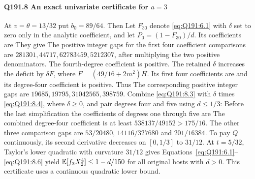 \paragraph{Q191.8 An exact univariate certificate for $a=\allowbreak 3$}\label{part:Q191.8}
At $v=\allowbreak \theta=\allowbreak 13/32$ put $b_0=\allowbreak 89/64$. Then
Let $F_{30}$ denote \eqref{eq:Q191:6.1} with $\delta$ set to zero only
in the analytic coefficient, and let $P_0=\allowbreak (1-F_{30})/d$. Its coefficients are
They give
The positive integer gaps for the first four coefficient comparisons are
$281301,\allowbreak 44717,\allowbreak 62783459,\allowbreak 5212307$, after multiplying the two positive
denominators. The fourth-degree coefficient is positive.
The retained $\delta$ increases the deficit by $\delta F$, where
$F=\allowbreak (49/16+2m^2)H$. Its first four coefficients are
and its degree-four coefficient is positive. Thus
The corresponding positive integer gaps are $19685,\allowbreak 19795,\allowbreak 31042565,\allowbreak 398759$.
Combine \eqref{eq:Q191:8.3} with $\delta$ times \eqref{eq:Q191:8.4},
where $\delta\ge0$, and pair degrees four and five using $d\le\allowbreak1/3$:
Before the last simplification the coefficients of degrees one through five are
The combined degree-four coefficient is at least $538137/49152>\allowbreak 175/16$.
The other three comparison gaps are $53/20480$, $14116/327680$ and
$201/16384$. To pay $Q$ continuously, its second derivative decreases on
$[0,\allowbreak 1/3]$ to $31/12$. At $t=\allowbreak 5/32$,
Taylor's lower quadratic with curvature $31/12$ gives
Equations~\eqref{eq:Q191:6.1}--\eqref{eq:Q191:8.6} yield
$\mathbb E[f_3X_2^4]\le\allowbreak 1-d/150$ for all original hosts with $d>\allowbreak 0$.
This certificate uses a continuous quadratic lower bound.

